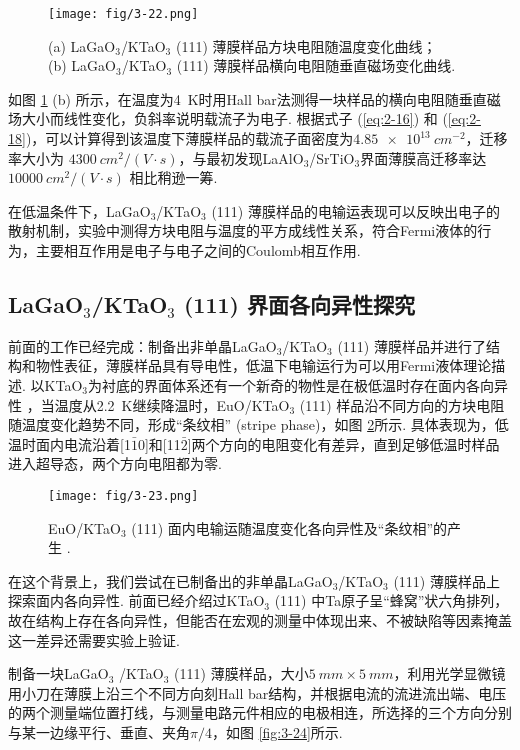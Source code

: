 \documentclass[12pt,a4paper,openany,twoside,UTF-8]{book}
\begin{document}
\begin{figure}[htbp]
\centering
\texttt{[image: fig/3-22.png]}
\caption{(a) LaGaO$_3$/KTaO$_3$ (111) 薄膜样品方块电阻随温度变化曲线；\\
(b) LaGaO$_3$/KTaO$_3$ (111) 薄膜样品横向电阻随垂直磁场变化曲线.}
\label{fig:3-22} 
\end{figure}



如图 \ref{fig:3-22} (b) 所示，在温度为\SI{4}{K}时用Hall bar法测得一块样品的横向电阻随垂直磁场大小而线性变化，负斜率说明载流子为电子. 根据式子 (\ref{eq:2-16}) 和 (\ref{eq:2-18})，可以计算得到该温度下薄膜样品的载流子面密度为$\SI{4.85e13}{cm^{-2}}$，迁移率大小为 $\SI{4300}{cm^2/(V\cdot s)}$，与最初发现LaAlO$_3$/SrTiO$_3$界面薄膜高迁移率达$\SI{10000}{cm^2/(V\cdot s)}$ \cite{ref7}相比稍逊一筹.

在低温条件下，LaGaO$_3$/KTaO$_3$ (111) 薄膜样品的电输运表现可以反映出电子的散射机制，实验中测得方块电阻与温度的平方成线性关系，符合Fermi液体的行为，主要相互作用是电子与电子之间的Coulomb相互作用.

\subsection{LaGaO$_3$/KTaO$_3$ (111) 界面各向异性探究}
前面的工作已经完成：制备出非单晶LaGaO$_3$/KTaO$_3$ (111) 薄膜样品并进行了结构和物性表征，薄膜样品具有导电性，低温下电输运行为可以用Fermi液体理论描述. 以KTaO$_3$为衬底的界面体系还有一个新奇的物性是在极低温时存在面内各向异性 \cite{ref22}，当温度从\SI{2.2}{K}继续降温时，EuO/KTaO$_3$ (111) 样品沿不同方向的方块电阻随温度变化趋势不同，形成“条纹相” (stripe phase)，如图 \ref{fig:3-23}所示. 具体表现为，低温时面内电流沿着[1$\bar{1}$0]和[11$\bar{2}$]两个方向的电阻变化有差异，直到足够低温时样品进入超导态，两个方向电阻都为零.

\begin{figure}[htbp]
\centering
\texttt{[image: fig/3-23.png]}
\caption{EuO/KTaO$_3$ (111) 面内电输运随温度变化各向异性及“条纹相”的产生 \cite{ref22}.}
\label{fig:3-23} 
\end{figure}

在这个背景上，我们尝试在已制备出的非单晶LaGaO$_3$/KTaO$_3$ (111) 薄膜样品上探索面内各向异性. 前面已经介绍过KTaO$_3$ (111) 中Ta原子呈“蜂窝”状六角排列，故在结构上存在各向异性，但能否在宏观的测量中体现出来、不被缺陷等因素掩盖这一差异还需要实验上验证.

制备一块LaGaO$_3$ /KTaO$_3$ (111) 薄膜样品，大小$\SI{5}{mm}\times\SI{5}{mm}$，利用光学显微镜用小刀在薄膜上沿三个不同方向刻Hall bar结构，并根据电流的流进流出端、电压的两个测量端位置打线，与测量电路元件相应的电极相连，所选择的三个方向分别与某一边缘平行、垂直、夹角$\pi/4$，如图 \ref{fig:3-24}所示.
\end{document}
